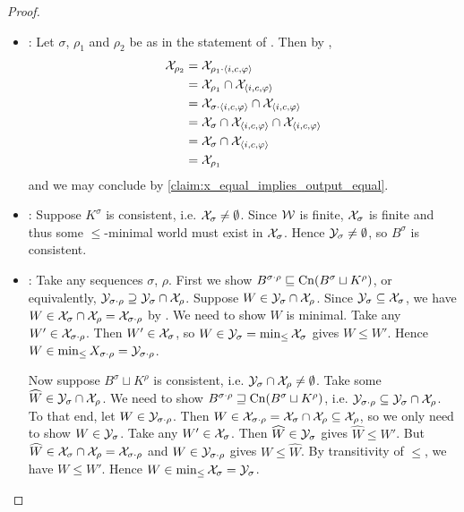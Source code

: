 \begin{proof}
\begin{itemize}
    \item \duprem{}: Let $\sigma$, $\rho_1$ and $\rho_2$ be as
          in the statement of \duprem{}. Then by
          \kconj{},
          \begin{align*}
            \mathcal{X}_{\rho_2}
            &= \mathcal{X}_{\rho_1 \cdot \langle {i, c, \varphi} \rangle} \\
            &= \mathcal{X}_{\rho_1} \cap \mathcal{X}_{\langle {i, c, \varphi} \rangle} \\
            &= \mathcal{X}_{\sigma \cdot \langle {i, c, \varphi} \rangle} \cap \mathcal{X}_{\langle {i, c,
            \varphi} \rangle} \\
            &= \mathcal{X}_{\sigma} \cap \mathcal{X}_{\langle {i, c, \varphi} \rangle} \cap \mathcal{X}_{\langle {i, c,
            \varphi} \rangle} \\
            &= \mathcal{X}_{\sigma} \cap \mathcal{X}_{\langle {i, c, \varphi} \rangle} \\
            &= \mathcal{X}_{\rho_1}
          \end{align*}
          and we may conclude by \cref{claim:x_equal_implies_output_equal}.
    \item \condcons{}: Suppose $K^\sigma$ is consistent,
          i.e. $\mathcal{X}_\sigma \ne \emptyset$. Since $\mathcal{W}$ is finite, $\mathcal{X}_\sigma$ is
          finite and thus some $\le$-minimal world must exist in $\mathcal{X}_\sigma$.
          Hence $\mathcal{Y}_\sigma \ne \emptyset$, so $B^\sigma$ is consistent.
    \item \incvac{}: Take any sequences $\sigma$, $\rho$. First
          we show $B^{\sigma \cdot \rho} \sqsubseteq \operatorname{Cn}(B^\sigma \sqcup
          K^\rho)$, or equivalently, $\mathcal{Y}_{\sigma \cdot \rho} \supseteq
          \mathcal{Y}_\sigma \cap \mathcal{X}_\rho$. Suppose $W \in \mathcal{Y}_\sigma \cap \mathcal{X}_\rho$.
          Since $\mathcal{Y}_\sigma \subseteq \mathcal{X}_\sigma$, we have $W \in \mathcal{X}_\sigma \cap
          \mathcal{X}_\rho = \mathcal{X}_{\sigma \cdot \rho}$ by \kconj{}. We need
          to show $W$ is minimal. Take any $W' \in \mathcal{X}_{\sigma \cdot \rho}$.
          Then $W' \in \mathcal{X}_{\sigma}$, so $W \in \mathcal{Y}_\sigma =
          \min_{\le}{\mathcal{X}_\sigma}$ gives $W \le W'$. Hence $W \in
          \min_{\le}{X_{\sigma \cdot \rho}} = \mathcal{Y}_{\sigma \cdot \rho}$.

          Now suppose $B^\sigma \sqcup K^\rho$ is consistent, i.e. $\mathcal{Y}_\sigma
          \cap \mathcal{X}_\rho \ne \emptyset$. Take some $\widehat{W} \in \mathcal{Y}_\sigma
          \cap \mathcal{X}_\rho$. We need to show $B^{\sigma \cdot \rho} \sqsupseteq
          \operatorname{Cn}(B^\sigma \sqcup K^\rho)$, i.e. $\mathcal{Y}_{\sigma \cdot \rho}
          \subseteq \mathcal{Y}_\sigma \cap \mathcal{X}_\rho$. To that end, let $W \in \mathcal{Y}_{\sigma
          \cdot \rho}$. Then $W \in \mathcal{X}_{\sigma \cdot \rho} = \mathcal{X}_\sigma \cap
          \mathcal{X}_\rho \subseteq \mathcal{X}_\rho$, so we only need to show $W \in
          \mathcal{Y}_\sigma$. Take any $W' \in \mathcal{X}_\sigma$. Then $\widehat{W} \in
          \mathcal{Y}_\sigma$ gives $\widehat{W} \le W'$. But $\widehat{W} \in \mathcal{X}_\sigma
          \cap \mathcal{X}_\rho = \mathcal{X}_{\sigma \cdot \rho}$ and $W \in \mathcal{Y}_{\sigma
          \cdot \rho}$ gives $W \le \widehat{W}$. By transitivity of $\le$,
          we have $W \le W'$.  Hence $W \in \min_{\le}{\mathcal{X}_\sigma} = \mathcal{Y}_\sigma$.


\end{itemize}
\end{proof}
